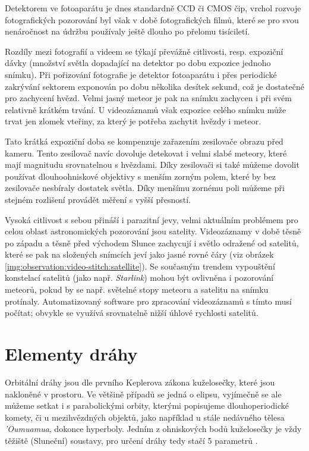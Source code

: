 Detektorem ve fotoaparátu je dnes standardně CCD či CMOS čip, vrchol rozvoje fotografických pozorování byl však v době fotografických filmů, které se pro svou nenáročnost na údržbu používaly ještě dlouho po přelomu tisíciletí.

\smallskip

Rozdíly mezi fotografií a videem se týkají převážně citlivosti, resp. expoziční dávky (množství světla dopadající na detektor po dobu expozice jednoho snímku). Při pořizování fotografie je detektor fotoaparátu i přes periodické zakrývání sektorem exponován po dobu několika desítek sekund, což je dostatečné pro zachycení hvězd. Velmi jasný meteor je pak na snímku zachycen i při svém relativně krátkém trvání. U videozáznamů však expozice celého snímku může trvat jen zlomek vteřiny, za který je potřeba zachytit hvězdy i meteor.

Tato krátká expoziční doba se kompenzuje zařazením zesilovače obrazu před kameru. Tento zesilovač navíc dovoluje detekovat i velmi slabé meteory, které mají magnitudu srovnatelnou s hvězdami. Díky zesilovači si také můžeme dovolit používat dlouhoohniskové objektivy s menším zorným polem, které by bez zesilovače nesbíraly dostatek světla. Díky menšímu zornému poli můžeme při stejném rozlišení provádět měření s vyšší přesností.

Vysoká citlivost s sebou přináší i parazitní jevy, velmi aktuálním problémem pro celou oblast astronomických pozorování jsou satelity. Videozáznamy v době těsně po západu a těsně před východem Slunce zachycují i světlo odražené od satelitů, které se pak na složených snímcích jeví jako jasné rovné čáry (viz obrázek \ref{img:observation:video-stitch:satellite}). Se současným trendem vypouštění konstelací satelitů (jako např. \textit{Starlink}) mohou být ovlivněna i pozorování meteorů, pokud by se např. světelné stopy meteoru a satelitu na snímku protínaly. Automatizovaný software pro zpracování videozáznamů s tímto musí počítat; obvykle se využívá srovnatelně nižší úhlové rychlosti satelitů.

\section{Elementy dráhy}\label{sec:orbit}%
Orbitální dráhy jsou dle prvního Keplerova zákona kuželosečky, které jsou nakloněné v prostoru. Ve většině případů se jedná o elipsu, vyjímečně se ale můžeme setkat i s parabolickými orbity, kterými popisujeme dlouhoperiodické komety, či u mezihvězdných objektů, jako například u stále nedávného tělesa \textit{'Oumuamua}, dokonce hyperboly. Jedním z ohniskových bodů kuželosečky je vždy těžiště (Sluneční) soustavy, pro určení dráhy tedy stačí 5 parametrů \cite{astro}.

